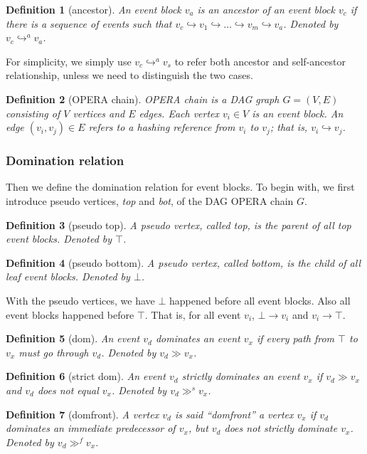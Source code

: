 \documentclass{article}
\newtheorem{defn}{Definition}[section]
\newcommand{\eancestor}{\hookrightarrow^{a}}
\newcommand{\erefz}{\hookrightarrow}
\newcommand{\dom}{\gg}
\newcommand{\sdom}{\gg^{s}}
\newcommand{\domf}{\gg^{f}}
\newcommand{\hbefore}{\rightarrow}
\begin{document}
\begin{defn}[ancestor]
	An event block $v_a$ is an ancestor of an event block $v_c$ if there is a sequence of events such that $v_c \erefz v_1 \erefz \dots \erefz v_m \erefz v_a $. Denoted by $v_c \eancestor v_a$.
\end{defn}


For simplicity, we simply use $v_c \eancestor v_s$ to refer both ancestor and self-ancestor relationship, unless we need to distinguish the two cases.

\begin{defn}[OPERA chain]
	OPERA chain is a DAG graph $G = (V, E)$ consisting of $V$ vertices and $E$ edges. Each vertex $v_i \in V$ is an event block. An edge $(v_i,v_j) \in E$ refers to a hashing reference from $v_i$ to $v_j$; that is, $v_i \erefz v_j$.
\end{defn}

\subsubsection{Domination relation}
Then we define the domination relation for event blocks. To begin with, we first introduce pseudo vertices, \emph{top} and \emph{bot}, of the DAG OPERA chain $G$.
\begin{defn}[pseudo top]
	A pseudo vertex, called top, is the parent of all top event blocks. Denoted by $\top$.
\end{defn}
\begin{defn}[pseudo bottom]
	A pseudo vertex, called bottom, is the child of all leaf event blocks. Denoted by $\bot$.
\end{defn}

With the pseudo vertices, we have $\bot$ happened before all event blocks. Also all event blocks happened before $\top$. That is, for all event $v_i$, $\bot \hbefore v_i$ and $v_i \hbefore \top$.

\begin{defn}[dom]
	An event $v_d$ dominates an event $v_x$ if every path from $\top$ to $v_x$ must go through $v_d$. Denoted by $v_d \dom v_x$.
\end{defn}

\begin{defn}[strict dom]
	An event $v_d$ strictly dominates an event $v_x$ if $v_d \dom v_x$ and $v_d$ does not equal $v_x$. Denoted by $v_d \sdom v_x$.
\end{defn}


\begin{defn}[domfront]
	A vertex $v_d$ is said ``domfront'' a vertex $v_x$ if  $v_d$ dominates an immediate predecessor of $v_x$, but $v_d$ does not strictly dominate $v_x$. Denoted by $v_d \domf v_x$.
\end{defn}
\end{document}
